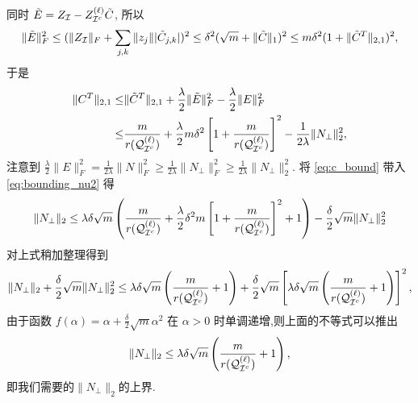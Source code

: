 同时 \(\tilde{E} = Z_{\mathcal{I}} - Z_{\mathcal{I}^c}^{(\ell)}\tilde{C}\), 所以 
\[\|\tilde{E}\|_F^2 \leq (\|Z_{\mathcal{I}}\|_F+\sum_{j,k} \|z_j\||\tilde{C}_{j,k}|)^2
\leq \delta^2 (\sqrt{m} + \|\tilde{C}\|_1)^2\leq m \delta^2(1+ \|\tilde{C}^T\|_{2,1})^2,\]
于是
\begin{align}
  \|C^T\|_{2,1} \leq& \|\tilde{C}^T\|_{2,1} +
  \frac{\lambda}{2}\|\tilde{E}\|_F^2-\frac{\lambda}{2}\|E\|_F^2\nonumber \\
  \leq& \frac{m}{r{(\mathcal{Q}_{\mathcal{I}^c}^{(\ell)})}}+\frac{\lambda}{2}m\delta^2
  \left[1+\frac{m}{r{(\mathcal{Q}_{\mathcal{I}^c}^{(\ell)})}}\right]^2-\frac{1}{2\lambda}\|N_{\perp}\|_2^2,
  \label{eq:c_bound}
\end{align}
注意到 \(\frac{\lambda}{2}\|E\|_F^2=\frac{1}{2\lambda}\|N\|_F^2
\geq\frac{1}{2\lambda}\|N_{\perp}\|_F^2 \geq\frac{1}{2\lambda}\|N_{\perp}\|_2^2\).
将 \eqref{eq:c_bound} 带入 \eqref{eq:bounding_nu2} 得
\[\|N_{\perp}\|_2 \leq \lambda \delta \sqrt{m} 
\left(\frac{m}{r(\mathcal{Q}_{\mathcal{I}^c}^{(\ell)})}+\frac{\lambda}{2}\delta^2m
\left[1+\frac{m}{r(\mathcal{Q}_{\mathcal{I}^c}^{(\ell)})}\right]^2+1\right)
-\frac{\delta}{2}\sqrt{m}\|N_{\perp}\|_2^2 \]
对上式稍加整理得到
\[\|N_{\perp}\|_2+\frac{\delta}{2}\sqrt{m}\|N_{\perp}\|_2^2\leq
  \lambda\delta\sqrt{m}\left(\frac{m}{r(\mathcal{Q}_{\mathcal{I}^c}^{(\ell)})}+1\right)+
  \frac{\delta}{2}\sqrt{m} \left[\lambda\delta\sqrt{m}
  \left(\frac{m}{r(\mathcal{Q}_{\mathcal{I}^c}^{(\ell)})}+1\right)\right]^2,\]
由于函数 \(f(\alpha)=\alpha+\frac{\delta}{2}\sqrt{m}\alpha^2\) 在 \(\alpha>0\)
时单调递增,则上面的不等式可以推出
\begin{equation}\label{eq:nu2_bound}
  \|N_{\perp}\|_2 \leq \lambda\delta\sqrt{m}\left(\frac{m}{r(\mathcal{Q}_{\mathcal{I}^c}^{(\ell)})}+1\right),
\end{equation}
即我们需要的\(\|N_{\perp}\|_2\)的上界.

